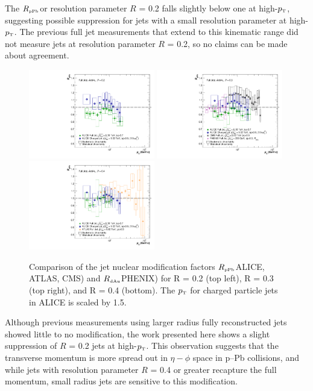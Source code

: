 \documentclass[ALICE]{ALICE_analysis_notes}
\newcommand{\pT}{$p_{\mbox{\tiny T}}$\xspace}
\newcommand{\pPb}{{\mbox{p--Pb}}\xspace}
\newcommand{\RpPb}{\texorpdfstring{$R_{\text{\tiny pPb}}$}\xspace\xspace}
\newcommand{\RdAu}{\texorpdfstring{$R_{\text{\tiny dAu}}$}\xspace\xspace}
\begin{document}
The \RpPb for resolution parameter $R$ = 0.2 falls slightly below one at high-\pT, suggesting possible suppression for jets with a small resolution parameter at high-\pT. The previous full jet measurements that extend to this kinematic range did not measure jets at resolution parameter $R$ = 0.2, so no claims can be made about agreement.

\begin{figure}[hbt!]
    \centering
    \includegraphics[width=0.49\textwidth]{figures/pPbFigures/RpPb/experimentComp/RpPbCombined_R02.pdf}
    \includegraphics[width=0.49\textwidth]{figures/pPbFigures/RpPb/experimentComp/RpPbCombined_R03.pdf}
    \includegraphics[width=0.49\textwidth]{figures/pPbFigures/RpPb/experimentComp/RpPbCombined_R04.pdf}
    \caption{Comparison of the jet nuclear modification factors \RpPb (ALICE, ATLAS, CMS) and \RdAu (PHENIX) for R = 0.2 (top left), R = 0.3 (top right), and R = 0.4 (bottom). The \pT for charged particle jets in ALICE is scaled by 1.5.}
    \label{fig:RpPbComp}
\end{figure}

Although previous measurements using larger radius fully reconstructed jets showed little to no modification, the work presented here shows a slight suppression of $R$ = 0.2 jets at high-\pT. This observation suggests that the transverse momentum is more spread out in $\eta-\phi$ space in \pPb collisions, and while jets with resolution parameter $R$ = 0.4 or greater recapture the full momentum, small radius jets are sensitive to this modification.
\end{document}
